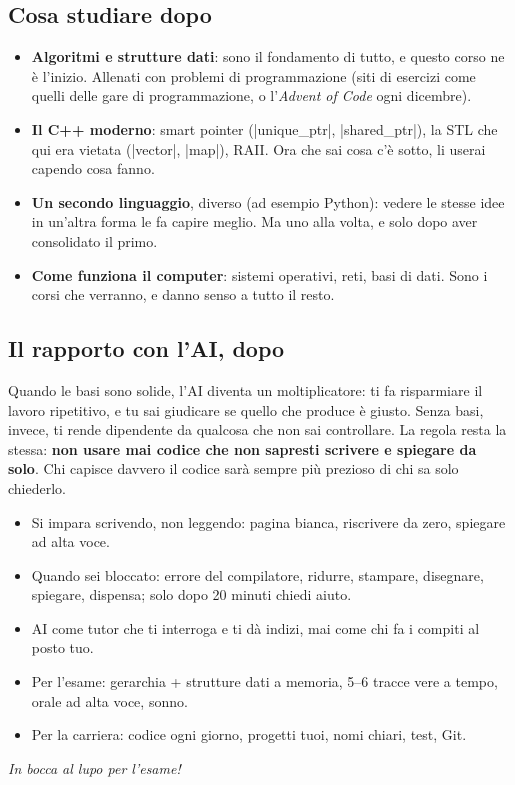\subsection*{Cosa studiare dopo}

\begin{itemize}
  \item \textbf{Algoritmi e strutture dati}: sono il fondamento di tutto, e questo corso
        ne è l'inizio. Allenati con problemi di programmazione (siti di esercizi come
        quelli delle gare di programmazione, o l'\emph{Advent of Code} ogni dicembre).
  \item \textbf{Il C++ moderno}: smart pointer (\cc|unique_ptr|, \cc|shared_ptr|), la STL
        che qui era vietata (\cc|vector|, \cc|map|), RAII. Ora che sai cosa c'è sotto, li
        userai capendo cosa fanno.
  \item \textbf{Un secondo linguaggio}, diverso (ad esempio Python): vedere le stesse idee
        in un'altra forma le fa capire meglio. Ma uno alla volta, e solo dopo aver
        consolidato il primo.
  \item \textbf{Come funziona il computer}: sistemi operativi, reti, basi di dati. Sono i
        corsi che verranno, e danno senso a tutto il resto.
\end{itemize}

\subsection*{Il rapporto con l'AI, dopo}

Quando le basi sono solide, l'AI diventa un moltiplicatore: ti fa risparmiare il lavoro
ripetitivo, e tu sai giudicare se quello che produce è giusto. Senza basi, invece, ti
rende dipendente da qualcosa che non sai controllare. La regola resta la stessa:
\textbf{non usare mai codice che non sapresti scrivere e spiegare da solo}. Chi capisce
davvero il codice sarà sempre più prezioso di chi sa solo chiederlo.

\begin{inparole}
\begin{itemize}
  \item Si impara scrivendo, non leggendo: pagina bianca, riscrivere da zero, spiegare
        ad alta voce.
  \item Quando sei bloccato: errore del compilatore, ridurre, stampare, disegnare,
        spiegare, dispensa; solo dopo 20 minuti chiedi aiuto.
  \item AI come tutor che ti interroga e ti dà indizi, mai come chi fa i compiti al posto
        tuo.
  \item Per l'esame: gerarchia + strutture dati a memoria, 5--6 tracce vere a tempo,
        orale ad alta voce, sonno.
  \item Per la carriera: codice ogni giorno, progetti tuoi, nomi chiari, test, Git.
\end{itemize}
\end{inparole}

\vspace{1em}
\begin{center}
\large\itshape In bocca al lupo per l'esame!
\end{center}
